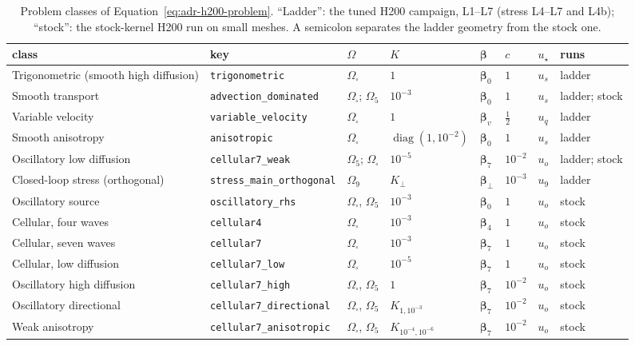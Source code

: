 \documentclass[10pt,a4paper]{article}
\begin{document}
\begin{table}[ht]
\centering\footnotesize
\setlength{\tabcolsep}{4pt}
\begin{tabular}{llllllll}
\toprule
class & key & $\Omega$ & $K$ & $\boldsymbol\beta$ & $c$ & $u_\star$ & runs\\
\midrule
Trigonometric (smooth high diffusion) & \texttt{trigonometric} & $\Omega_\square$ & $1$ & $\boldsymbol\beta_0$ & $1$ & $u_s$ & ladder\\
Smooth transport & \texttt{advection\_dominated} & $\Omega_\square$; $\Omega_5$ & $10^{-3}$ & $\boldsymbol\beta_0$ & $1$ & $u_s$ & ladder; stock\\
Variable velocity & \texttt{variable\_velocity} & $\Omega_\square$ & $1$ & $\boldsymbol\beta_v$ & $\tfrac12$ & $u_q$ & ladder\\
Smooth anisotropy & \texttt{anisotropic} & $\Omega_\square$ & $\operatorname{diag}(1,10^{-2})$ & $\boldsymbol\beta_0$ & $1$ & $u_s$ & ladder\\
Oscillatory low diffusion & \texttt{cellular7\_weak} & $\Omega_5$; $\Omega_\square$ & $10^{-5}$ & $\boldsymbol\beta_7$ & $10^{-2}$ & $u_o$ & ladder; stock\\
Closed-loop stress (orthogonal) & \texttt{stress\_main\_orthogonal} & $\Omega_9$ & $K_\perp$ & $\boldsymbol\beta_\perp$ & $10^{-3}$ & $u_9$ & ladder\\
\midrule
Oscillatory source & \texttt{oscillatory\_rhs} & $\Omega_\square$, $\Omega_5$ & $10^{-3}$ & $\boldsymbol\beta_0$ & $1$ & $u_o$ & stock\\
Cellular, four waves & \texttt{cellular4} & $\Omega_\square$ & $10^{-3}$ & $\boldsymbol\beta_4$ & $1$ & $u_o$ & stock\\
Cellular, seven waves & \texttt{cellular7} & $\Omega_\square$ & $10^{-3}$ & $\boldsymbol\beta_7$ & $1$ & $u_o$ & stock\\
Cellular, low diffusion & \texttt{cellular7\_low} & $\Omega_\square$ & $10^{-5}$ & $\boldsymbol\beta_7$ & $1$ & $u_o$ & stock\\
Oscillatory high diffusion & \texttt{cellular7\_high} & $\Omega_\square$, $\Omega_5$ & $1$ & $\boldsymbol\beta_7$ & $10^{-2}$ & $u_o$ & stock\\
Oscillatory directional & \texttt{cellular7\_directional} & $\Omega_\square$, $\Omega_5$ & $K_{1,10^{-3}}$ & $\boldsymbol\beta_7$ & $10^{-2}$ & $u_o$ & stock\\
Weak anisotropy & \texttt{cellular7\_anisotropic} & $\Omega_\square$, $\Omega_5$ & $K_{10^{-4},10^{-6}}$ & $\boldsymbol\beta_7$ & $10^{-2}$ & $u_o$ & stock\\
\bottomrule
\end{tabular}
\caption{Problem classes of Equation~\eqref{eq:adr-h200-problem}. ``Ladder'': the tuned H200
campaign, L1--L7 (stress L4--L7 and L4b); ``stock'': the stock-kernel H200 run on small meshes. A
semicolon separates the ladder geometry from the stock one.}
\label{tab:adr-h200-cases}
\end{table}
\end{document}
